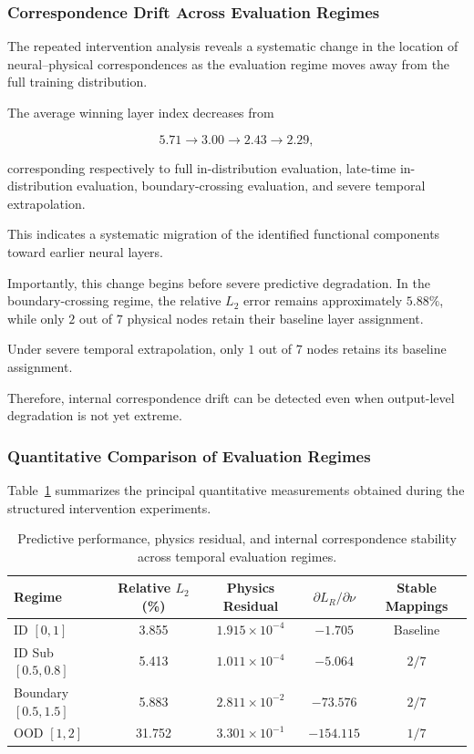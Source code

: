 \documentclass[12pt,singleside,a4paper]{article}
\begin{document}
\subsubsection{Correspondence Drift Across Evaluation Regimes}

The repeated intervention analysis reveals a systematic change in the
location of neural--physical correspondences as the evaluation regime
moves away from the full training distribution.

The average winning layer index decreases from

\begin{equation}
    5.71
    \rightarrow
    3.00
    \rightarrow
    2.43
    \rightarrow
    2.29,
\end{equation}

corresponding respectively to full in-distribution evaluation,
late-time in-distribution evaluation, boundary-crossing evaluation,
and severe temporal extrapolation.

This indicates a systematic migration of the identified functional
components toward earlier neural layers.

Importantly, this change begins before severe predictive degradation.
In the boundary-crossing regime, the relative $L_2$ error remains
approximately $5.88\%$, while only $2$ out of $7$ physical nodes retain
their baseline layer assignment.

Under severe temporal extrapolation, only $1$ out of $7$ nodes retains
its baseline assignment.

Therefore, internal correspondence drift can be detected even when
output-level degradation is not yet extreme.


\subsubsection{Quantitative Comparison of Evaluation Regimes}

Table~\ref{tab:phase3_regimes} summarizes the principal quantitative
measurements obtained during the structured intervention experiments.

\begin{table}[htbp]
\centering
\caption{Predictive performance, physics residual, and internal
correspondence stability across temporal evaluation regimes.}
\label{tab:phase3_regimes}
\begin{tabular}{lcccc}
\hline
\textbf{Regime}
&
\textbf{Relative $L_2$ (\%)}
&
\textbf{Physics Residual}
&
\textbf{$\partial L_R/\partial\nu$}
&
\textbf{Stable Mappings}
\\
\hline
ID $[0,1]$
& 3.855
& $1.915\times10^{-4}$
& $-1.705$
& Baseline
\\
ID Sub $[0.5,0.8]$
& 5.413
& $1.011\times10^{-4}$
& $-5.064$
& $2/7$
\\
Boundary $[0.5,1.5]$
& 5.883
& $2.811\times10^{-2}$
& $-73.576$
& $2/7$
\\
OOD $[1,2]$
& 31.752
& $3.301\times10^{-1}$
& $-154.115$
& $1/7$
\\
\hline
\end{tabular}
\end{table}
\end{document}

